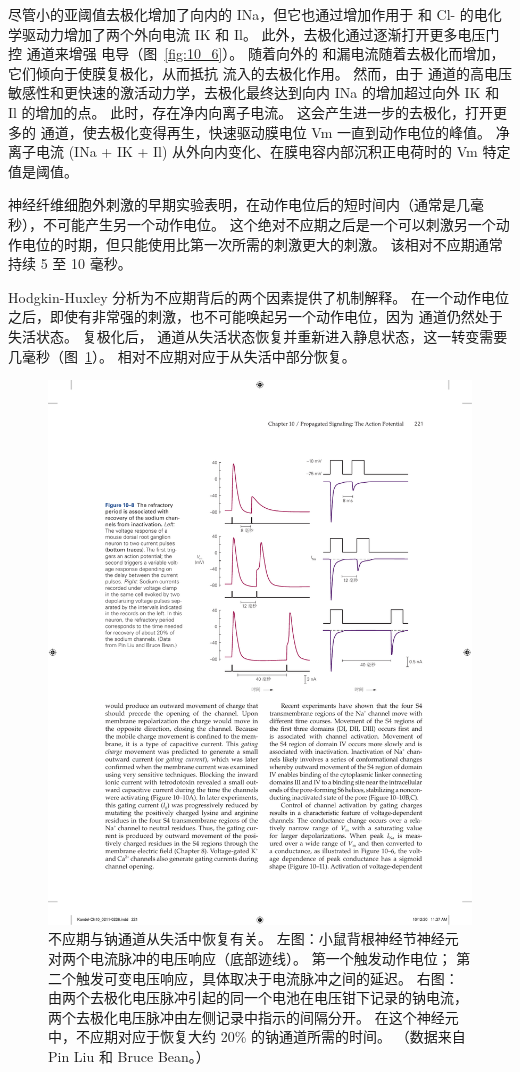 尽管小的亚阈值去极化增加了向内的 INa，但它也通过增加作用于  和 Cl- 的电化学驱动力增加了两个外向电流 IK 和 Il。
此外，去极化通过逐渐打开更多电压门控  通道来增强  电导（图~\ref{fig:10_6}）。 
随着向外的  和漏电流随着去极化而增加，它们倾向于使膜复极化，从而抵抗  流入的去极化作用。
然而，由于  通道的高电压敏感性和更快速的激活动力学，去极化最终达到向内 INa 的增加超过向外 IK 和 Il 的增加的点。
此时，存在净内向离子电流。
这会产生进一步的去极化，打开更多的  通道，使去极化变得再生，快速驱动膜电位 Vm 一直到动作电位的峰值。
净离子电流 (INa + IK + Il) 从外向内变化、在膜电容内部沉积正电荷时的 Vm 特定值是阈值。


神经纤维细胞外刺激的早期实验表明，在动作电位后的短时间内（通常是几毫秒），不可能产生另一个动作电位。 
这个绝对不应期之后是一个可以刺激另一个动作电位的时期，但只能使用比第一次所需的刺激更大的刺激。 
该相对不应期通常持续 5 至 10 毫秒。


Hodgkin-Huxley 分析为不应期背后的两个因素提供了机制解释。
在一个动作电位之后，即使有非常强的刺激，也不可能唤起另一个动作电位，因为  通道仍然处于失活状态。 
复极化后， 通道从失活状态恢复并重新进入静息状态，这一转变需要几毫秒（图~\ref{fig:10_8}）。 
相对不应期对应于从失活中部分恢复。


\begin{figure}[htbp]
	\centering
	\includegraphics[width=0.7\linewidth]{chap10/fig_10_8}
	\caption{不应期与钠通道从失活中恢复有关。 左图：小鼠背根神经节神经元对两个电流脉冲的电压响应（底部迹线）。 第一个触发动作电位； 第二个触发可变电压响应，具体取决于电流脉冲之间的延迟。 右图：由两个去极化电压脉冲引起的同一个电池在电压钳下记录的钠电流，两个去极化电压脉冲由左侧记录中指示的间隔分开。 在这个神经元中，不应期对应于恢复大约 20\% 的钠通道所需的时间。 （数据来自 Pin Liu 和 Bruce Bean。）}
	\label{fig:10_8}
\end{figure}


